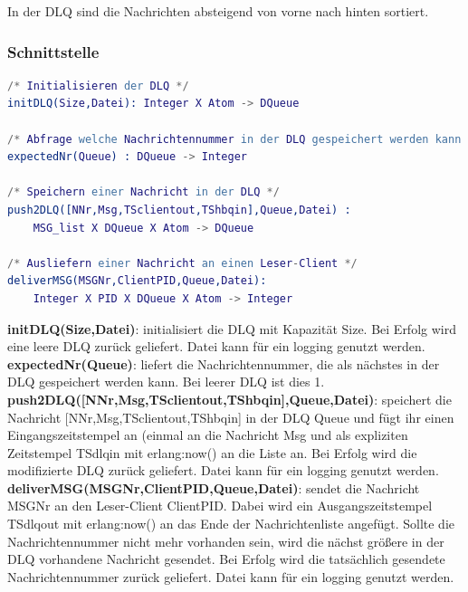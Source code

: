 \documentclass{article}
\begin{document}
In der DLQ sind die Nachrichten absteigend von vorne nach hinten sortiert.

\subsubsection{Schnittstelle}
\begin{lstlisting}[language=erlang]
/* Initialisieren der DLQ */
initDLQ(Size,Datei): Integer X Atom -> DQueue

/* Abfrage welche Nachrichtennummer in der DLQ gespeichert werden kann */
expectedNr(Queue) : DQueue -> Integer

/* Speichern einer Nachricht in der DLQ */
push2DLQ([NNr,Msg,TSclientout,TShbqin],Queue,Datei) :
    MSG_list X DQueue X Atom -> DQueue

/* Ausliefern einer Nachricht an einen Leser-Client */
deliverMSG(MSGNr,ClientPID,Queue,Datei):
    Integer X PID X DQueue X Atom -> Integer
\end{lstlisting}

\textbf{initDLQ(Size,Datei)}: initialisiert die DLQ mit Kapazität Size. Bei Erfolg wird eine leere DLQ zurück geliefert.
Datei kann für ein logging genutzt werden.\\

\textbf{expectedNr(Queue)}: liefert die Nachrichtennummer, die als nächstes in der DLQ gespeichert werden kann.
Bei leerer DLQ ist dies 1.\\

\textbf{push2DLQ([NNr,Msg,TSclientout,TShbqin],Queue,Datei)}: speichert die Nachricht [NNr,Msg,TSclientout,TShbqin] in
der DLQ Queue und fügt ihr einen Eingangszeitstempel an (einmal an die Nachricht Msg und als expliziten Zeitstempel
TSdlqin mit erlang:now() an die Liste an. Bei Erfolg wird die modifizierte DLQ zurück geliefert. Datei kann für ein
logging genutzt werden.\\

\textbf{deliverMSG(MSGNr,ClientPID,Queue,Datei)}: sendet die Nachricht MSGNr an den Leser-Client ClientPID. Dabei wird
ein Ausgangszeitstempel TSdlqout mit erlang:now() an das Ende der Nachrichtenliste angefügt. Sollte die Nachrichtennummer
nicht mehr vorhanden sein, wird die nächst größere in der DLQ vorhandene Nachricht gesendet. Bei Erfolg wird die
tatsächlich gesendete Nachrichtennummer zurück geliefert. Datei kann für ein logging genutzt werden.\\
\end{document}
